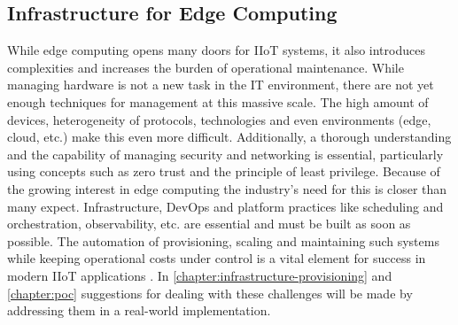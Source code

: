     \subsection{Infrastructure for Edge Computing}
        While edge computing opens many doors for IIoT systems, it also introduces complexities and increases the burden of operational maintenance. While managing hardware is not a new task in the IT environment, there are not yet enough techniques for management at this massive scale. The high amount of devices, heterogeneity of protocols, technologies and even environments (edge, cloud, etc.) make this even more difficult. Additionally, a thorough understanding and the capability of managing security and networking is essential, particularly using concepts such as zero trust and the principle of least privilege. Because of the growing interest in edge computing the industry's need for this is closer than many expect. Infrastructure, DevOps and platform practices like scheduling and orchestration, observability, etc. are essential and must be built as soon as possible. The automation of provisioning, scaling and maintaining such systems while keeping operational costs under control is a vital element for success in modern IIoT applications \cite{perez_edge_2022, youtube_ibm_technology_what_2019}. In \autoref{chapter:infrastructure-provisioning} and \autoref{chapter:poc} suggestions for dealing with these challenges will be made by addressing them in a real-world implementation. 
